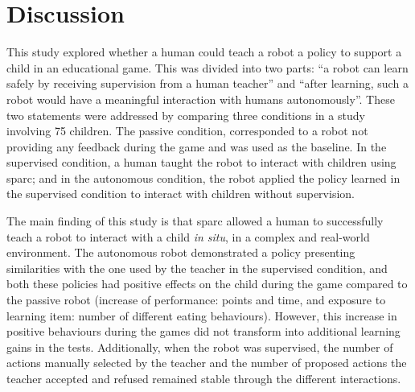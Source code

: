 %
%


\section{Discussion} \label{sec:tutoring_discussion}

This study explored whether a human could teach a robot a policy to support a child in an educational game. This was divided into two parts: ``a robot can learn safely by receiving supervision from a human teacher'' and ``after learning, such a robot would have a meaningful interaction with humans autonomously''. These two statements were addressed by comparing three conditions in a study involving 75 children. The passive condition, corresponded to a robot not providing any feedback during the game and was used as the baseline. In the supervised condition, a human taught the robot to interact with children using \gls{sparc}; and in the autonomous condition, the robot applied the policy learned in the supervised condition to interact with children without supervision.

The main finding of this study is that \gls{sparc} allowed a human to successfully teach a robot to interact with a child \textit{in situ}, in a complex and real-world environment. The autonomous robot demonstrated a policy presenting similarities with the one used by the teacher in the supervised condition, and both these policies had positive effects on the child during the game compared to the passive robot (increase of performance: points and time, and exposure to learning item: number of different eating behaviours). However, this increase in positive behaviours during the games did not transform into additional learning gains in the tests. Additionally, when the robot was supervised, the number of actions manually selected by the teacher and the number of proposed actions the teacher accepted and refused remained stable through the different interactions.


